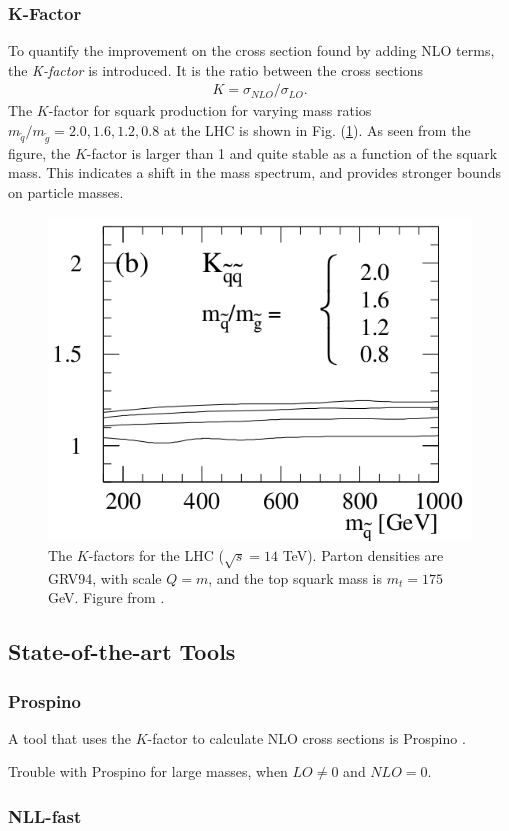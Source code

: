 \documentclass[twoside,english]{uiofysmaster}
\begin{document}
\subsubsection{K-Factor}

To quantify the improvement on the cross section found by adding NLO terms, the \textit{K-factor} is introduced. It is the ratio between the cross sections
\begin{align}
K = \sigma_{NLO}/\sigma_{LO}.
\end{align}
The $K$-factor for squark production for varying mass ratios $m_{\tilde{q}}/m_{\tilde{g}}=2.0, 1.6,1.2,0.8$ at the LHC is shown in Fig. (\ref{Fig:: susy hadron : K-factor LHC}). As seen from the figure, the $K$-factor is larger than 1 and quite stable as a function of the squark mass. This indicates a shift in the mass spectrum, and provides stronger bounds on particle masses.

\begin{figure}
\centering
\includegraphics[scale=0.5]{squark_gluino_K_factor.png}
\caption{The $K$-factors for the LHC ($\sqrt{s}=14$ TeV). Parton densities are GRV94, with scale $Q=m$, and the top squark mass is $m_t=175$ GeV. Figure from \cite{beenakker1997squark}.}
\label{Fig:: susy hadron : K-factor LHC}
\end{figure}


\subsection{State-of-the-art Tools}

\subsubsection{Prospino}
A tool that uses the $K$-factor to calculate NLO cross sections is Prospino \cite{beenakker1996prospino}.

Trouble with Prospino for large masses, when $LO \neq 0$ and $NLO =0$. 


\subsubsection{NLL-fast}





\end{document}
